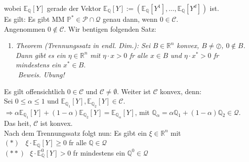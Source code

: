 \documentclass[envcountsame,envcountchap,envcountsect,amsart]{svmono}
\begin{document}
\begin{enumerate}
\begin{center}
\end{center}
wobei $\mathbb{E}_{\mathbb{Q}}\left[Y\right]$ gerade der Vektor
$\mathbb{E}_{\mathbb{Q}}\left[Y\right]:=\left(\mathbb{E}_{\mathbb{Q}}\left[Y^1\right],...,\mathbb{E}_{\mathbb{Q}}\left[Y^d\right]\right)$ ist.\vspace*{.1cm}\\
Es gilt: Es gibt MM $\mathbb{P}^*\in \mathcal{P}\cap\mathcal{Q}$ genau dann, wenn $0\in\mathcal{C}$.\vspace*{.1cm}\\
Angenommen $0\notin \mathcal{C}$. Wir bentigen folgenden Satz:\vspace*{.1cm}\\
\begin{enumerate}
	\item[] \textit{Theorem (Trennungssatz in endl. Dim.): Sei $B\in \mathds{R}^n$ konvex, $B\neq\oslash$, $0\notin B$. Dann gibt es ein $\eta\in \mathds{R}^n$ mit $\eta\cdot x>0$ fr alle $x\in B$ und $\eta\cdot x^*>0$ fr mindestens ein $x^*\in B$}.\vspace*{.1cm}\\${}$
\textit{Beweis. Ubung!}
\end{enumerate}${}$\vspace*{.1cm}\\
Es gilt offensichtlich $0\in \mathcal{C}$ und $\mathcal{C}\neq\emptyset$. Weiter ist $\mathcal{C}$ konvex, denn:\vspace*{.1cm}\\
Sei $0\leq \alpha \leq 1$ und $\mathbb{E}_{\mathbb{Q}_1}\left[Y\right],\mathbb{E}_{\mathbb{Q}_2}\left[Y\right]\in\mathcal{C}$.\vspace*{.1cm}\\
$\Longrightarrow \alpha \mathbb{E}_{\mathbb{Q}_1}\left[Y\right]+\left(1-\alpha\right)\mathbb{E}_{\mathbb{Q}_2}\left[Y\right]=\mathbb{E}_{\mathbb{Q}_{\alpha}}\left[Y\right]$, mit $\mathbb{Q}_{\alpha}=\alpha\mathbb{Q}_1+\left(1-\alpha\right)\mathbb{Q}_2\in\mathcal{Q}$. Das heit, $\mathcal{C}$ ist konvex.\vspace*{.1cm}\\
Nach dem Trennungssatz folgt nun: Es gibt ein $\xi\in \mathds{R}^n$ mit\vspace*{.2cm}\\
$\left(*\right)\ \ \ \ \xi\cdot\mathbb{E}_{\mathbb{Q}}\left[Y\right]\geq 0$ fr alle $\mathbb{Q}\in\mathcal{Q}$\vspace*{.1cm}\\
$\left(**\right)\ \ \ \xi\cdot\mathbb{E}_{\mathbb{Q}}^0\left[Y\right]> 0$ fr mindestens ein $\mathbb{Q}^0\in\mathcal{Q}$\vspace*{.2cm}\\

\end{enumerate}
\end{document}
